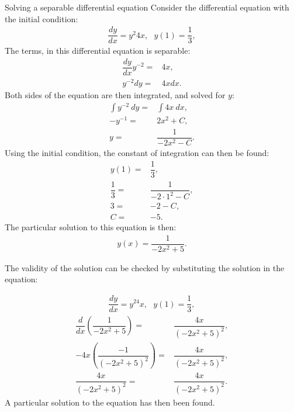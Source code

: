 \begin{example}{Solving a separable differential equation}{}
Consider the differential equation with the initial condition:
\begin{align*}
	\dfrac{dy}{dx} = y^2 4x, ~~~
	y(1) = \dfrac{1}{3},
\end{align*}
The terms, in this differential equation is separable: 
\begin{align*}
	\dfrac{dy}{dx} y^{-2} =& 4x, \\
	y^{-2} dy =& 4x dx. 
\end{align*}
Both sides of the equation are then integrated, and solved for $y$:
\begin{align*}
	\int{y^{-2}\ dy} =& \int{4x\  dx}, \\
	-y^{-1} =& 2x^2 +C, \\
	y =& \dfrac{1}{-2x^2-C}.
\end{align*}
Using the initial condition, the constant of integration can then be found:
\begin{align*}
	y(1) =& \dfrac{1}{3}, \\
	\dfrac{1}{3} =& \dfrac{1}{-2 \cdot 1^2-C}, \\
	3 =& -2-C, \\
	C =& -5.
\end{align*}
The particular solution to this equation is then:
\begin{align*}
	y(x) = \dfrac{1}{-2x^2+5}.
\end{align*}

The validity of the solution can be checked by substituting the solution in the equation:


\begin{align*}
	\dfrac{dy}{dx} = y^24x, ~~~
	y(1) = \dfrac{1}{3},
\end{align*}
\begin{align*}
	\dfrac{d}{dx} \left(\dfrac{1}{-2x^2+5}\right) =& \dfrac{4x}{(-2x^2+5)^2}, \\
	-4x\left(\dfrac{-1}{(-2x^2+5)^2}\right)  =& \dfrac{4x}{(-2x^2+5)^2}, \\
	\dfrac{4x}{(-2x^2+5)^2} =& \dfrac{4x}{(-2x^2+5)^2}.
\end{align*}
A particular solution to the equation has then been found.
\end{example}
